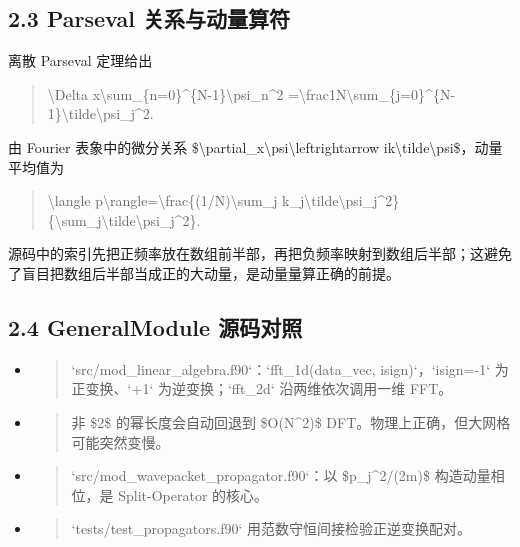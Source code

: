 \documentclass[UTF8,openany,11pt,fontset=fandol]{ctexbook}
\begin{document}
\subsection{\texorpdfstring{\textbf{2.3 Parseval
关系与动量算符}}{2.3 Parseval 关系与动量算符}}\label{parseval-ux5173ux7cfbux4e0eux52a8ux91cfux7b97ux7b26}

离散 Parseval 定理给出

\begin{quote}
\textbackslash Delta
x\textbackslash sum\_\{n=0\}\^{}\{N-1\}\textbar\textbackslash psi\_n\textbar\^{}2
=\textbackslash frac1N\textbackslash sum\_\{j=0\}\^{}\{N-1\}\textbar\textbackslash tilde\textbackslash psi\_j\textbar\^{}2.
\end{quote}

由 Fourier 表象中的微分关系
\$\textbackslash partial\_x\textbackslash psi\textbackslash leftrightarrow
ik\textbackslash tilde\textbackslash psi\$，动量平均值为

\begin{quote}
\textbackslash langle
p\textbackslash rangle=\textbackslash frac\{(1/N)\textbackslash sum\_j
k\_j\textbar\textbackslash tilde\textbackslash psi\_j\textbar\^{}2\}
\{\textbackslash sum\_j\textbar\textbackslash tilde\textbackslash psi\_j\textbar\^{}2\}.
\end{quote}

源码中的索引先把正频率放在数组前半部，再把负频率映射到数组后半部；这避免了盲目把数组后半部当成正的大动量，是动量量算正确的前提。

\subsection{\texorpdfstring{\textbf{2.4 GeneralModule
源码对照}}{2.4 GeneralModule 源码对照}}\label{generalmodule-ux6e90ux7801ux5bf9ux7167-1}

\begin{itemize}
\item
  \begin{quote}
  `src/mod\_linear\_algebra.f90`：`fft\_1d(data\_vec,
  isign)`，`isign=-1` 为正变换、`+1` 为逆变换；`fft\_2d`
  沿两维依次调用一维 FFT。
  \end{quote}
\item
  \begin{quote}
  非 \$2\$ 的幂长度会自动回退到 \$O(N\^{}2)\$
  DFT。物理上正确，但大网格可能突然变慢。
  \end{quote}
\item
  \begin{quote}
  `src/mod\_wavepacket\_propagator.f90`：以 \$p\_j\^{}2/(2m)\$
  构造动量相位，是 Split-Operator 的核心。
  \end{quote}
\item
  \begin{quote}
  `tests/test\_propagators.f90` 用范数守恒间接检验正逆变换配对。
  \end{quote}
\end{itemize}
\end{document}

